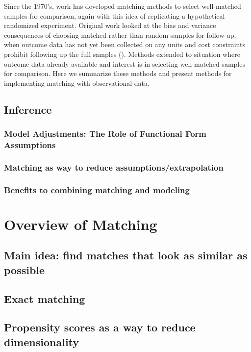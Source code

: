 \documentclass[11pt,titlepage]{article}
\begin{document}
Since the 1970's, work has developed matching methods to select well-matched samples for comparison, again with this idea of replicating a hypothetical
randomized experiment.  Original work looked at the bias and variance consequences  of choosing matched rather than random samples for follow-up, when
outcome data has not yet been collected on any units and cost constraints prohibit following up the full samples (\cite{AltRub70, Rubin73a, Rubin73b}).  Methods extended to situation 
where outcome data already available and interest is in selecting well-matched samples for comparison.  Here we summarize these methods and
present methods for implementing matching with observational data.


\subsection{Inference}
\subsubsection{Model Adjustments: The Role of Functional Form Assumptions}
\subsubsection{Matching as way to reduce assumptions/extrapolation}
\subsubsection{Benefits to combining matching and modeling}
                                                                                                                                                             
\section{Overview of Matching}
\subsection{Main idea: find matches that look as similar as possible}
\subsection{Exact matching}
\subsection{Propensity scores as a way to reduce dimensionality}
\end{document}

